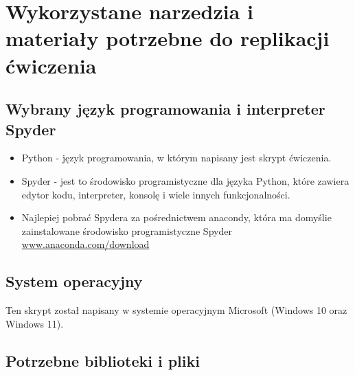\section{Wykorzystane narzedzia i materiały potrzebne do replikacji ćwiczenia}

\subsection{Wybrany język programowania i interpreter Spyder}

\begin{itemize}
\item Python - język programowania, w którym napisany jest skrypt ćwiczenia.
\item Spyder - jest to środowisko programistyczne dla języka Python, które zawiera edytor kodu, interpreter, konsolę i wiele innych funkcjonalności.
\item Najlepiej pobrać Spydera za pośrednictwem anacondy, która ma domyślie zainstalowane środowisko programistyczne Spyder \href{https://www.anaconda.com/download}{www.anaconda.com/download}	\citep{Anaconda}
\end{itemize}

\subsection{System operacyjny}

Ten skrypt został napisany w systemie operacyjnym Microsoft (Windows 10 oraz Windows 11).

\subsection{Potrzebne biblioteki i pliki}

